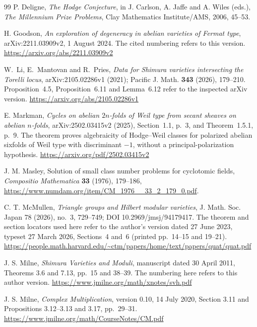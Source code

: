 \begin{thebibliography}{99}
P. Deligne,
\emph{The Hodge Conjecture}, in J. Carlson, A. Jaffe and A. Wiles (eds.),
\emph{The Millennium Prize Problems}, Clay Mathematics Institute/AMS,
2006, 45--53.

H. Goodson,
\emph{An exploration of degeneracy in abelian varieties of Fermat type},
arXiv:2211.03909v2, 1 August 2024.
The cited numbering refers to this version.
\url{https://arxiv.org/abs/2211.03909v2}

W.~Li, E.~Mantovan and R.~Pries,
\emph{Data for Shimura varieties intersecting the Torelli locus},
arXiv:2105.02286v1 (2021); Pacific J. Math. \textbf{343} (2026), 179--210.
Proposition~4.5, Proposition~6.11 and Lemma~6.12 refer to the
inspected arXiv version.
\url{https://arxiv.org/abs/2105.02286v1}

E. Markman,
\emph{Cycles on abelian $2n$-folds of Weil type from secant sheaves on abelian $n$-folds},
arXiv:2502.03415v2 (2025), Section~1.1, p.~3, and Theorem~1.5.1, p.~9.
The theorem proves algebraicity of Hodge--Weil classes for polarized
abelian sixfolds of Weil type with discriminant $-1$, without a
principal-polarization hypothesis.
\url{https://arxiv.org/pdf/2502.03415v2}

J. M. Masley,
Solution of small class number problems for cyclotomic fields,
\emph{Compositio Mathematica} \textbf{33} (1976), 179--186,
\url{https://www.numdam.org/item/CM_1976__33_2_179_0.pdf}.

C. T. McMullen,
\emph{Triangle groups and Hilbert modular varieties},
J. Math. Soc. Japan 78 (2026), no.~3, 729--749; DOI 10.2969/jmsj/94179417.
The theorem and section locators used here refer to the author's version
dated 27 June 2023, typeset 27 March 2026, Sections~4 and~6
(printed pp.~14--15 and 19--21).
\url{https://people.math.harvard.edu/~ctm/papers/home/text/papers/quat/quat.pdf}

J. S. Milne,
\emph{Shimura Varieties and Moduli}, manuscript dated 30 April 2011,
Theorems 3.6 and 7.13, pp.~15 and 38--39. The numbering here refers to
this author version.
\url{https://www.jmilne.org/math/xnotes/svh.pdf}

J. S. Milne,
\emph{Complex Multiplication}, version 0.10, 14 July 2020,
Section 3.11 and Propositions 3.12--3.13 and 3.17, pp.~29--31.
\url{https://www.jmilne.org/math/CourseNotes/CM.pdf}


\end{thebibliography}
